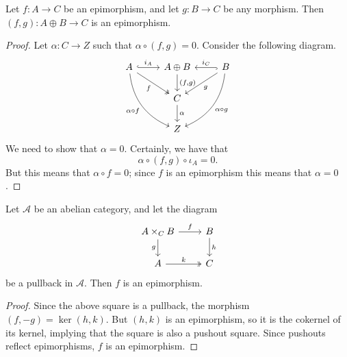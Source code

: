 \documentclass[main.tex]{subfiles}
\begin{document}
\begin{lemma}
  Let $f\colon A \to C$ be an epimorphism, and let $g\colon B \to C$ be any morphism. Then $(f, g)\colon A \oplus B \to C$ is an epimorphism.
\end{lemma}
\begin{proof}
  Let $\alpha\colon C \to Z$ such that $\alpha \circ (f, g) = 0$. Consider the following diagram.
  \begin{equation*}
    \begin{tikzcd}
      A
      \arrow[r, hook, "i_{A}"]
      \arrow[dr, swap, two heads, "f"]
      \arrow[ddr, bend right, swap, "\alpha \circ f"]
      & A \oplus B
      \arrow[d, "{(f, g)}"]
      & B
      \arrow[dl, "g"]
      \arrow[l, hook, swap, "i_{C}"]
      \arrow[ddl, bend left, "\alpha \circ g"]
      \\
      & C
      \arrow[d, "\alpha"]
      \\
      & Z
    \end{tikzcd}
  \end{equation*}
  We need to show that $\alpha = 0$. Certainly, we have that
  \begin{equation*}
    \alpha \circ (f, g) \circ \iota_{A} = 0.
  \end{equation*}
  But this means that $\alpha \circ f = 0$; since $f$ is an epimorphism this means that $\alpha = 0$.
\end{proof}

\begin{lemma}
  \label{lemma:pullback_of_epi_is_epi}
  Let $\mathcal{A}$ be an abelian category, and let the diagram
  \begin{equation*}
    \begin{tikzcd}
      A \times_{C} B
      \arrow[r, "f"]
      \arrow[d, swap, "g"]
      & B
      \arrow[d, "h"]
      \\
      A
      \arrow[r, two heads, "k"]
      & C
    \end{tikzcd}
  \end{equation*}
  be a pullback in $\mathcal{A}$. Then $f$ is an epimorphism.
\end{lemma}
\begin{proof}
  Since the above square is a pullback, the morphism $(f, -g) = \ker (h, k)$. But $(h, k)$ is an epimorphism, so it is the cokernel of its kernel, implying that the square is also a pushout square. Since pushouts reflect epimorphisms, $f$ is an epimorphism.
\end{proof}
\end{document}
